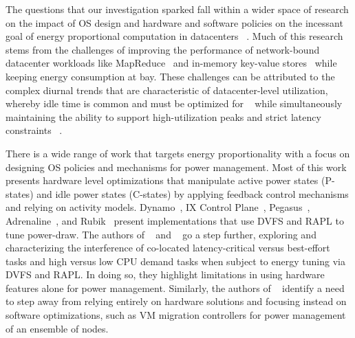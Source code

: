 \label{sec:related}

The questions that our investigation sparked
fall within a wider space of research
on the impact of OS design
and hardware and software policies
on the incessant goal of energy proportional computation in datacenters
~\cite{energyproportion, warehouse-power}.
Much of this research stems from
the challenges of improving the performance of
network-bound datacenter workloads
like MapReduce~\cite{large-scale-mapreduce}
and in-memory key-value stores~\cite{mica, zygos}
while keeping energy consumption at bay.
These challenges can be attributed to
the complex diurnal trends
that are characteristic of datacenter-level utilization,
whereby idle time is common and must be optimized for
~\cite{hotpower2008, powernap, napsac}
while simultaneously maintaining the ability to support high-utilization peaks and strict latency constraints
~\cite{Dynamo, SmoothOperator, oldi-pegasus, adrenaline, ixcp, rubik, eurosys14, zygos}.



There is a wide range of work
that targets energy proportionality
with a focus on designing OS policies and mechanisms for power management.
Most of this work presents hardware level optimizations
that manipulate active power states (P-states) %
and idle power states (C-states) %
by applying feedback control mechanisms %
and relying on activity models. %
Dynamo~\cite{Dynamo}, IX Control Plane~\cite{ixcp}, Pegasus~\cite{oldi-pegasus}, Adrenaline~\cite{adrenaline}, and Rubik~\cite{rubik}
present implementations
that use DVFS %
and RAPL %
to tune power-draw.
The authors of ~\cite{heracles} and ~\cite{PerAppPower} go a step further,
exploring and characterizing the interference of co-located
latency-critical versus best-effort tasks
and high versus low CPU demand tasks
when subject to energy tuning via DVFS and RAPL.
In doing so,
they highlight limitations
in using hardware features alone for power management.
Similarly, the authors of ~\cite{hotpower2008}
identify a need to step away
from relying entirely on hardware solutions
and focusing instead on software optimizations,
such as VM migration controllers for power management of an ensemble of nodes.



